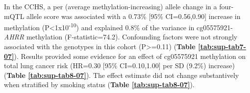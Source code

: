 \documentclass[11pt,twoside]{bristolthesis}
\begin{document}
In the CCHS, a per (average methylation-increasing) allele change in a four-mQTL allele score was associated with a 0.73\% {[}95\% CI=0.56,0.90{]} increase in methylation (P\textless1x10\textsuperscript{-10}) and explained 0.8\% of the variance in cg05575921-\emph{AHRR} methylation (F-statistic=74.2). Confounding factors were not strongly associated with the genotypes in this cohort (P\textgreater=0.11) (\textbf{Table \ref{tab:sup-tab7-07}}). Results provided some evidence for an effect of cg05575921 methylation on total lung cancer risk (HR=0.30 {[}95\% CI=0.10,1.00{]} per SD (9.2\%) increase) (\textbf{Table \ref{tab:sup-tab8-07}}). The effect estimate did not change substantively when stratified by smoking status (\textbf{Table \ref{tab:sup-tab8-07}}). \linebreak
\begin{table}[!h]


\end{table}
\end{document}
